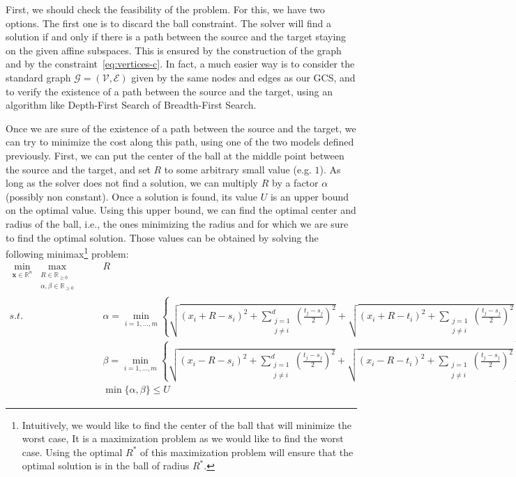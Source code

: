 \documentclass[a4paper, 12pt]{article}
\begin{document}
First, we should check the feasibility of the problem. For this, we have two options. The first one is to discard the ball constraint. The solver will find a solution if and only if there is a path between the source and the target staying on the given affine subspaces. This is ensured by the construction of the graph and by the constraint~\ref{eq:vertices-c}. In fact, a much easier way is to consider the standard graph $\mathcal{G} = (\mathcal{V}, \mathcal{E})$ given by the same nodes and edges as our GCS, and to verify the existence of a path between the source and the target, using an algorithm like Depth-First Search of Breadth-First Search.

Once we are sure of the existence of a path between the source and the target, we can try to minimize the cost along this path, using one of the two models defined previously. First, we can put the center of the ball at the middle point between the source and the target, and set $R$ to some arbitrary small value (e.g. $1$). As long as the solver does not find a solution, we can multiply $R$ by a factor $\alpha$ (possibly non constant). Once a solution is found, its value $U$ is an upper bound on the optimal value. Using this upper bound, we can find the optimal center and radius of the ball, i.e., the ones minimizing the radius and for which we are sure to find the optimal solution. Those values can be obtained by solving the following minimax\footnote{Intuitively, we would like to find the center of the ball that will minimize the worst case, 
It is a maximization problem as we would like to find the worst case. Using the optimal $R^*$ of this maximization problem will ensure that the optimal solution is in the ball of radius $R^*$.} problem:
\begin{subequations}\label{eq:ball}
    \begin{align}
        \min_{\mathbf{x} \in \mathbb{R}^n} \max_{\substack{R \in \mathbb{R}_{\geq 0} \\ \alpha, \beta \in \mathbb{R}_{\geq 0}}} &&& R\label{eq:ball-a}\\
        s.t. &&& \alpha = \min_{i=1, \dots, m} \left\{\sqrt{{(x_i + R - s_i)}^2 + \sum_{\substack{j = 1 \\ j \neq i}}^{d}{\left(\frac{t_j - s_j}{2}\right)}^2} + \sqrt{{(x_i + R - t_i)}^2 + \sum_{\substack{j = 1 \\ j \neq i}}{\left(\frac{t_j - s_j}{2}\right)}^2}\right\}\label{eq:ball-b}\\
             &&& \beta = \min_{i=1, \dots, m} \left\{\sqrt{{(x_i - R - s_i)}^2 + \sum_{\substack{j = 1 \\ j \neq i}}^{d}{\left(\frac{t_j - s_j}{2}\right)}^2} + \sqrt{{(x_i - R - t_i)}^2 + \sum_{\substack{j = 1 \\ j \neq i}}{\left(\frac{t_j - s_j}{2}\right)}^2}\right\}\label{eq:ball-c}\\
             &&& \min \{\alpha, \beta\} \leq U\label{eq:ball-d}
    \end{align}
\end{subequations}
\end{document}
